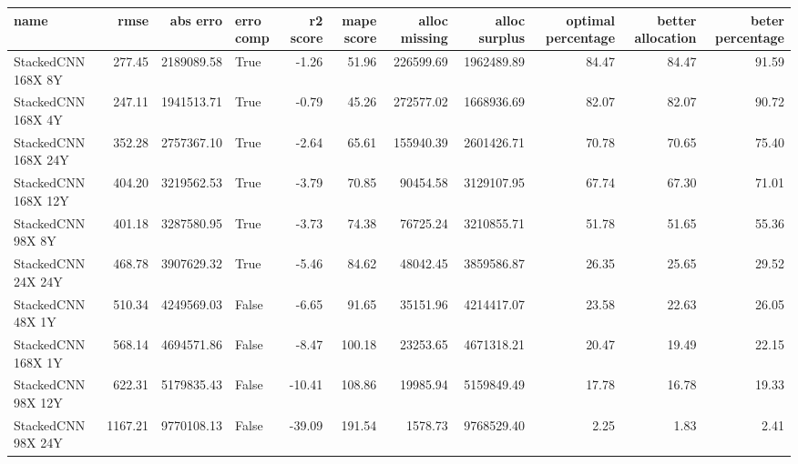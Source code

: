 \begin{tabular}{lrrlrrrrrrr}
\toprule
name & rmse & abs erro & erro comp & r2 score & mape score & alloc missing & alloc surplus & optimal percentage & better allocation & beter percentage \\
\midrule
StackedCNN 168X 8Y & 277.45 & 2189089.58 & True & -1.26 & 51.96 & 226599.69 & 1962489.89 & 84.47 & 84.47 & 91.59 \\
StackedCNN 168X 4Y & 247.11 & 1941513.71 & True & -0.79 & 45.26 & 272577.02 & 1668936.69 & 82.07 & 82.07 & 90.72 \\
StackedCNN 168X 24Y & 352.28 & 2757367.10 & True & -2.64 & 65.61 & 155940.39 & 2601426.71 & 70.78 & 70.65 & 75.40 \\
StackedCNN 168X 12Y & 404.20 & 3219562.53 & True & -3.79 & 70.85 & 90454.58 & 3129107.95 & 67.74 & 67.30 & 71.01 \\
StackedCNN 98X 8Y & 401.18 & 3287580.95 & True & -3.73 & 74.38 & 76725.24 & 3210855.71 & 51.78 & 51.65 & 55.36 \\
StackedCNN 24X 24Y & 468.78 & 3907629.32 & True & -5.46 & 84.62 & 48042.45 & 3859586.87 & 26.35 & 25.65 & 29.52 \\
StackedCNN 48X 1Y & 510.34 & 4249569.03 & False & -6.65 & 91.65 & 35151.96 & 4214417.07 & 23.58 & 22.63 & 26.05 \\
StackedCNN 168X 1Y & 568.14 & 4694571.86 & False & -8.47 & 100.18 & 23253.65 & 4671318.21 & 20.47 & 19.49 & 22.15 \\
StackedCNN 98X 12Y & 622.31 & 5179835.43 & False & -10.41 & 108.86 & 19985.94 & 5159849.49 & 17.78 & 16.78 & 19.33 \\
StackedCNN 98X 24Y & 1167.21 & 9770108.13 & False & -39.09 & 191.54 & 1578.73 & 9768529.40 & 2.25 & 1.83 & 2.41 \\
\bottomrule
\end{tabular}
